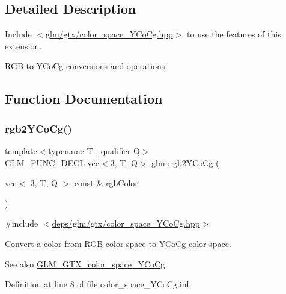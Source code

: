 \subsection{Detailed Description}
Include $<$\hyperlink{color__space__YCoCg_8hpp}{glm/gtx/color\+\_\+space\+\_\+\+Y\+Co\+Cg.\+hpp}$>$ to use the features of this extension.

R\+GB to Y\+Co\+Cg conversions and operations 

\subsection{Function Documentation}
\mbox{\label{group__gtx__color__space__YCoCg_ga0606353ec2a9b9eaa84f1b02ec391bc5}} 
\subsubsection{\texorpdfstring{rgb2\+Y\+Co\+Cg()}{rgb2YCoCg()}}
{\footnotesize\ttfamily template$<$typename T , qualifier Q$>$ \\
G\+L\+M\+\_\+\+F\+U\+N\+C\+\_\+\+D\+E\+CL \hyperlink{structglm_1_1vec}{vec}$<$3, T, Q$>$ glm\+::rgb2\+Y\+Co\+Cg (\begin{DoxyParamCaption}\item[{\hyperlink{structglm_1_1vec}{vec}$<$ 3, T, Q $>$ const \&}]{rgb\+Color }\end{DoxyParamCaption})}



{\ttfamily \#include $<$\hyperlink{color__space__YCoCg_8hpp}{deps/glm/gtx/color\+\_\+space\+\_\+\+Y\+Co\+Cg.\+hpp}$>$}

Convert a color from R\+GB color space to Y\+Co\+Cg color space. \begin{DoxySeeAlso}{See also}
\hyperlink{group__gtx__color__space__YCoCg}{G\+L\+M\+\_\+\+G\+T\+X\+\_\+color\+\_\+space\+\_\+\+Y\+Co\+Cg} 
\end{DoxySeeAlso}


Definition at line 8 of file color\+\_\+space\+\_\+\+Y\+Co\+Cg.\+inl.

\mbox{\label{group__gtx__color__space__YCoCg_ga0389772e44ca0fd2ba4a79bdd8efe898}} 
